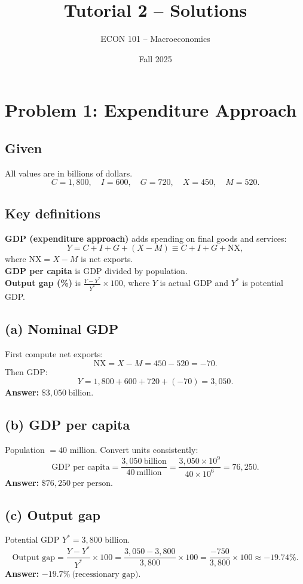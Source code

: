 \documentclass[11pt]{article}
\title{Tutorial 2 -- Solutions}
\author{ECON 101 -- Macroeconomics}
\date{Fall 2025}
\newcommand{\defn}[1]{\textbf{#1}}
\newcommand{\bn}{\vspace{0.25em}\noindent}
\begin{document}
\maketitle





\section*{Problem 1: Expenditure Approach}

\subsection*{Given}
All values are in billions of dollars.
\[
C=1{,}800,\quad I=600,\quad G=720,\quad X=450,\quad M=520.
\]

\subsection*{Key definitions}
\bn \defn{GDP (expenditure approach)} adds spending on final goods and services:
\[
Y = C + I + G + (X - M) \equiv C+I+G+\text{NX},
\]
where \(\text{NX}=X-M\) is net exports.\\
\defn{GDP per capita} is GDP divided by population.\\
\defn{Output gap (\%)} is \(\displaystyle \frac{Y - Y^*}{Y^*}\times 100\), where \(Y\) is actual GDP and \(Y^*\) is potential GDP.

\subsection*{(a) Nominal GDP}
First compute net exports:
\[
\text{NX} = X - M = 450 - 520 = -70.
\]
Then GDP:
\[
Y = 1{,}800 + 600 + 720 + (-70) = 3{,}050.
\]
\textbf{Answer:} \(\boxed{\$3{,}050\ \text{billion}}\).

\subsection*{(b) GDP per capita}
Population \(= 40\) million. Convert units consistently:
\[
\text{GDP per capita} = \frac{3{,}050\ \text{billion}}{40\ \text{million}}
= \frac{3{,}050\times 10^9}{40\times 10^6}
= 76{,}250.
\]
\textbf{Answer:} \(\boxed{\$76{,}250\ \text{per person}}\).

\subsection*{(c) Output gap}
Potential GDP \(Y^* = 3{,}800\) billion.
\[
\text{Output gap} = \frac{Y - Y^*}{Y^*}\times 100
= \frac{3{,}050 - 3{,}800}{3{,}800}\times 100
= \frac{-750}{3{,}800}\times 100 \approx -19.74\%.
\]
\textbf{Answer:} \(\boxed{-19.7\%\ \text{(recessionary gap)}}\).
\end{document}

